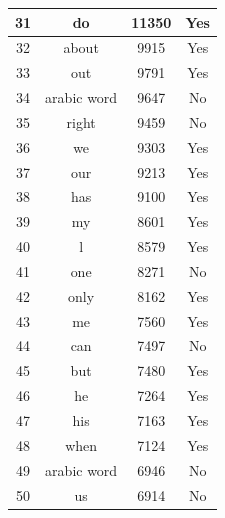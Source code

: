 \begin{table}
\begin{center}
\begin{tabular}{ c | c | c | c}
31 & do & 11350 & Yes \\ \hline
32 & about & 9915 & Yes \\ \hline
33 & out & 9791 & Yes \\ \hline
34 & arabic word & 9647 & No \\ \hline
35 & right & 9459 & No \\ \hline
36 & we & 9303 & Yes \\ \hline
37 & our & 9213 & Yes \\ \hline
38 & has & 9100 & Yes \\ \hline
39 & my & 8601 & Yes \\ \hline
40 & l & 8579 & Yes \\ \hline
41 & one & 8271 & No \\ \hline
42 & only & 8162 & Yes \\ \hline
43 & me & 7560 & Yes \\ \hline
44 & can & 7497 & No \\ \hline
45 & but & 7480 & Yes \\ \hline
46 & he & 7264 & Yes \\ \hline
47 & his & 7163 & Yes \\ \hline
48 & when & 7124 & Yes \\ \hline
49 & arabic word & 6946 & No \\ \hline
50 & us & 6914 & No \\ \hline
\hline

\end{tabular}
\end{center}
\end{table} ​

